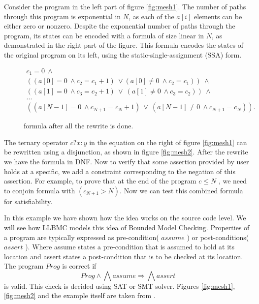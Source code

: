 \documentclass[14pt]{article}
\begin{document}
{Consider the program in the left part of figure \ref{fig:mesh1}. The number of paths through this program is exponential in \(N\), as each of the \(a[i]\) elements can be either zero or nonzero. Despite the exponential number of paths through the program, its states can be encoded with a formula of size linear in \(N\), as demonstrated in the right part of the figure. This formula encodes the states of the original program on its left, using the static-single-assignment (SSA) form. 		 	 	 		
 
 


\begin{figure}[thp]
\begin{gather*}
c_1 = 0 \  \wedge \\
((a[0] = 0 \  \wedge c_2 = c_1 + 1)  \ \vee (a[0] \neq 0\  \wedge c_2 = c_1)) \  \wedge \\
((a[1] = 0 \  \wedge c_3 = c_2 + 1)  \ \vee \  (a[1] \neq 0\  \wedge c_3 = c_2)) \  \wedge \\
... \\
((a[N-1] = 0 \  \wedge c_{N+1} = c_N + 1)  \ \vee \  (a[N-1] \neq 0\  \wedge c_{N+1} = c_N)).
\end{gather*}
\caption{formula after all the rewrite is done.}
\end{figure}


The ternary operator \(c?x:y\) in the equation on the right of figure \ref{fig:mesh1} can be rewritten using a disjunction, as shown in figure \ref{fig:mesh2}. After the rewrite we have the formula in DNF. Now to verify that some assertion provided by user holds at a specific, we add a constraint corresponding to the negation of this assertion. For example, to prove that at the end of the program \(c \leq N\) , we need to conjoin formula with \((c_{N+1}>N)\). Now we can test this combined formula for satisfiability. 

In this example we have shown how the idea works on the source code level. We will see how LLBMC models this idea of Bounded Model Checking. Properties of a program are typically expressed  as pre-condition( \(assume\) ) or post-conditions( \(assert\) ). Where assume states a pre-condition that is assumed to hold at its location and assert states a post-condition that is to be checked at its location. The program  \(Prog\)  is correct if
\[Prog \wedge \bigwedge assume \Rightarrow  \bigwedge assert\]
is valid. This check is decided using SAT or SMT solver. Figures \ref{fig:mesh1}, \ref{fig:mesh2} and the example itself are taken from \cite{book decision procedures}.


}
\end{document}
